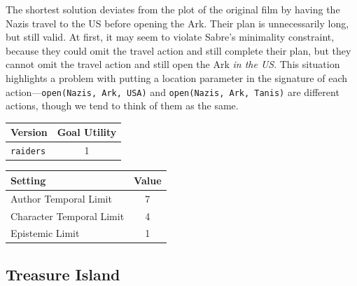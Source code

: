 \documentclass{nilreport}
\begin{document}
\medskip{}

\noindent The shortest solution deviates from the plot of the original
film by having the Nazis travel to the US before opening the Ark.
Their plan is unnecessarily long, but still valid. At first, it may
seem to violate Sabre's minimality constraint, because they could
omit the travel action and still complete their plan, but they cannot
omit the travel action and still open the Ark \emph{in the US}. This
situation highlights a problem with putting a location parameter in
the signature of each action---\texttt{open(Nazis, Ark, USA)} and
\texttt{open(Nazis, Ark, Tanis)} are different actions, though we
tend to think of them as the same.

\medskip{}
\noindent{}

\medskip{}

\begin{center}
\begin{tabular}[t]{|l|c|}
\hline 
\textbf{Version} & \textbf{Goal Utility}\tabularnewline
\hline 
\hline 
\texttt{raiders} & 1\tabularnewline
\hline 
\end{tabular}\textbf{\quad{}}%
\begin{tabular}[t]{|l|c|}
\hline 
\textbf{Setting} & \textbf{Value}\tabularnewline
\hline 
\hline 
Author Temporal Limit & 7\tabularnewline
\hline 
Character Temporal Limit & 4\tabularnewline
\hline 
Epistemic Limit & 1\tabularnewline
\hline 
\end{tabular}
\par\end{center}

\subsection{Treasure Island}
\end{document}
